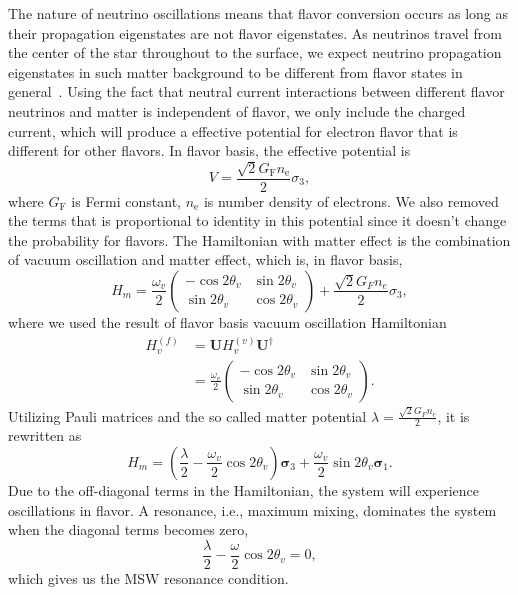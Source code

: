 The nature of neutrino oscillations means that flavor conversion occurs as long as their propagation eigenstates are not flavor eigenstates. As neutrinos travel from the center of the star throughout to the surface, we expect neutrino propagation eigenstates in such matter background to be different from flavor states in general~\cite{wolf78}. Using the fact that neutral current interactions between different flavor neutrinos and matter is independent of flavor, we only include the charged current, which will produce a effective potential for electron flavor that is different for other flavors. In flavor basis, the effective potential is
\begin{equation}
V=\frac{\sqrt{2}G_{\mathrm F} n_{\mathrm e} }{2} \sigma_3,
\end{equation}
where $G_{\mathrm F}$ is Fermi constant, $n_{\mathrm e}$ is number density of electrons. We also removed the terms that is proportional to identity in this potential since it doesn't change the probability for flavors. The Hamiltonian with matter effect is the combination of vacuum oscillation and matter effect, which is, in flavor basis,
\begin{equation}
H_m = \frac{ \omega_v }{2}\begin{pmatrix} -\cos 2\theta_v & \sin 2 \theta_v \\ \sin 2\theta_v & \cos 2\theta_v  \end{pmatrix} + \frac{\sqrt{2}G_F n_e}{2} \sigma_3,
\end{equation}
where we used the result of flavor basis vacuum oscillation Hamiltonian
\begin{align}
H_v^{(f)}& = \mathbf{U} H_v^{(v)}\mathbf{U^\dagger} \\
&= \frac{ \omega_v }{2}\begin{pmatrix} -\cos 2\theta_v & \sin 2 \theta_v \\ \sin 2\theta_v & \cos 2\theta_v  \end{pmatrix}.
\end{align}
Utilizing Pauli matrices and the so called matter potential $\lambda = \frac{\sqrt{2}G_F n_e}{2}$, it is rewritten as
\begin{equation}
H_m = \left(\frac{\lambda}{2} -\frac{ \omega_v }{2} \cos 2\theta_v \right) \boldsymbol{\sigma}_3  + \frac{ \omega_v }{2} \sin 2\theta_v \boldsymbol{\sigma}_1.
\label{chap:basics-sec:msw-eqn:hamiltonian-matter-effect}
\end{equation}
Due to the off-diagonal terms in the Hamiltonian, the system will experience oscillations in flavor. A resonance, i.e., maximum mixing, dominates the system when the diagonal terms becomes zero,
\begin{equation}
\frac{\lambda}{2} -\frac{ \omega }{2} \cos 2\theta_v  = 0,
\end{equation}
which gives us the MSW resonance condition.

